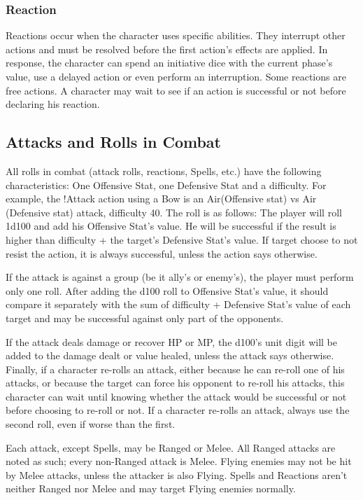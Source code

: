 \begin{multicols}{2}
\subsubsection{Reaction}
Reactions occur when the character uses
specific abilities. They interrupt other actions and
must be resolved before the first action’s effects
are applied. In response, the character can spend
an initiative dice with the current phase’s value,
use a delayed action or even perform an
interruption. Some reactions are free actions. A
character may wait to see if an action is successful
or not before declaring his reaction.

\subsection{Attacks and Rolls in Combat}
\label{subsec:attacks}
All rolls in combat (attack rolls, reactions,
Spells, etc.) have the following characteristics: One
Offensive Stat, one Defensive Stat and a difficulty.
For example, the !Attack action using a Bow is an
Air(Offensive stat) vs Air (Defensive stat) attack,
difficulty 40. The roll is as follows: The player will
roll 1d100 and add his Offensive Stat’s value. He
will be successful if the result is higher than
difficulty + the target’s Defensive Stat’s value. If
target choose to not resist the action, it is always
successful, unless the action says otherwise.

If the attack is against a group (be it ally’s
or enemy’s), the player must perform only one roll.
After adding the d100 roll to Offensive Stat’s value,
it should compare it separately with the sum of
difficulty + Defensive Stat’s value of each target
and may be successful against only part of the
opponents.

If the attack deals damage or recover HP or
MP, the d100’s unit digit will be added to the
damage dealt or value healed, unless the attack
says otherwise. Finally, if a character re-rolls an
attack, either because he can re-roll one of his
attacks, or because the target can force his
opponent to re-roll his attacks, this character can
wait until knowing whether the attack would be
successful or not before choosing to re-roll or not.
If a character re-rolls an attack, always use the
second roll, even if worse than the first.

Each attack, except Spells, may be Ranged
or Melee. All Ranged attacks are noted as such;
every non-Ranged attack is Melee. Flying enemies
may not be hit by Melee attacks, unless the
attacker is also Flying. Spells and Reactions aren't
neither Ranged nor Melee and may target Flying
enemies normally.


\end{multicols}
